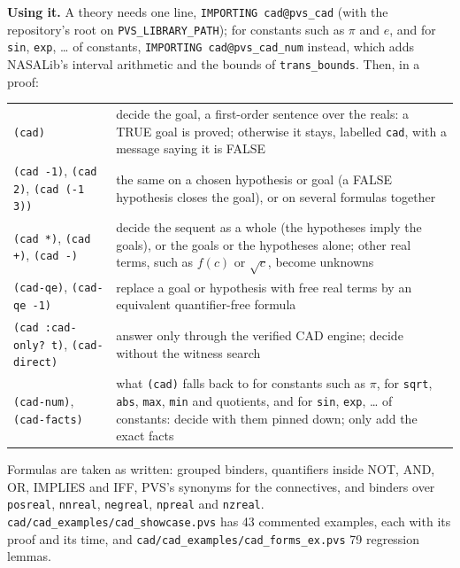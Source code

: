 \documentclass[11pt]{article}
\begin{document}
\textbf{Using it.} A theory needs one line, \texttt{IMPORTING cad@pvs\_cad} (with the repository's root on
\texttt{PVS\_LIBRARY\_PATH}); for constants such as $\pi$ and $e$, and for
\texttt{sin}, \texttt{exp}, \ldots{} of constants, \texttt{IMPORTING cad@pvs\_cad\_num} instead, which adds NASALib's
interval arithmetic and the bounds of \texttt{trans\_bounds}. Then, in a proof:
\begin{center}\small
\begin{tabularx}{\textwidth}{@{}>{\raggedright\arraybackslash}p{} X@{}}
\toprule
\mbox{\texttt{(cad)}} & decide the goal, a first-order sentence over the reals: a TRUE goal is proved; otherwise it stays,
labelled \texttt{cad}, with a message saying it is FALSE\\
\mbox{\texttt{(cad -1)}}, \mbox{\texttt{(cad 2)}}, \mbox{\texttt{(cad (-1 3))}} & the same on a chosen hypothesis or goal (a FALSE hypothesis
closes the goal), or on several formulas together\\
\mbox{\texttt{(cad *)}}, \mbox{\texttt{(cad +)}}, \mbox{\texttt{(cad -)}} & decide the sequent as a whole (the hypotheses imply the goals), or
the goals or the hypotheses alone; other real terms, such as $f(c)$ or $\sqrt{c}$, become unknowns\\
\mbox{\texttt{(cad-qe)}}, \mbox{\texttt{(cad-qe -1)}} & replace a goal or hypothesis with free real terms by an equivalent
quantifier-free formula\\
\mbox{\texttt{(cad :cad-only? t)}}, \mbox{\texttt{(cad-direct)}} & answer only through the verified CAD engine; decide without the
witness search\\
\mbox{\texttt{(cad-num)}}, \mbox{\texttt{(cad-facts)}} & what \texttt{(cad)} falls back to for constants such as $\pi$, for
\texttt{sqrt}, \texttt{abs}, \texttt{max}, \texttt{min} and quotients, and for \texttt{sin}, \texttt{exp}, \ldots{} of constants: decide with them pinned down; only add the exact facts\\
\bottomrule
\end{tabularx}
\end{center}
Formulas are taken as written: grouped binders, quantifiers inside NOT, AND, OR, IMPLIES and IFF, PVS's synonyms for the
connectives, and binders over \texttt{posreal}, \texttt{nnreal}, \texttt{negreal}, \texttt{npreal} and \texttt{nzreal}.
\texttt{cad/cad\_examples/cad\_showcase.pvs} has 43 commented examples, each with its proof and its time, and
\texttt{cad/cad\_examples/cad\_forms\_ex.pvs} 79 regression lemmas.
\end{document}
